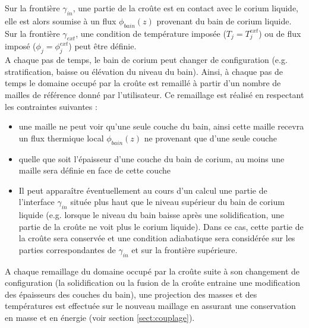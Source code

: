 Sur la frontière $\gamma_{in}$, une partie de la croûte est en contact avec le corium liquide, elle est alors soumise à un flux $\phi_{bain}(z)$ provenant du bain de corium liquide. Sur la frontière $\gamma_{ext}$, une condition de température imposée ($T_j=T_j^{ext}$) ou de flux imposé ($\phi_j=\phi_j^{ext}$) peut être définie.\\
 
A chaque pas de temps, le bain de corium peut changer de configuration (e.g. stratification, baisse ou élévation du niveau du bain). Ainsi, à chaque pas de temps le domaine occupé par la croûte est remaillé à partir d'un nombre de mailles de référence donné par l'utilisateur. Ce remaillage est réalisé en respectant les contraintes suivantes :
\begin{itemize}
    \item une maille ne peut voir qu'une seule couche du bain, ainsi cette maille recevra un flux thermique local $\phi_{bain}(z)$ ne provenant que d'une seule couche
    \item quelle que soit l'épaisseur d'une couche du bain de corium, au moins une maille sera définie en face de cette couche
    \item  Il peut apparaître éventuellement au cours d'un calcul une partie de l'interface $\gamma_{in}$ située plus haut que le niveau supérieur du bain de corium liquide (e.g. lorsque le niveau du bain baisse après une solidification, une partie de la croûte ne voit plus le corium liquide). Dans ce cas, cette partie de la croûte sera conservée et une condition adiabatique sera considérée sur les parties correspondantes de $\gamma_{in}$ et sur la frontière supérieure.\\
\end{itemize}

A chaque remaillage du domaine occupé par la croûte suite à son changement de configuration (la solidification ou la fusion de la croûte entraine une modification des épaisseurs des couches du bain), une projection des masses et des températures est effectuée sur le nouveau maillage en assurant une conservation en masse et en énergie (voir section \ref{sect:couplage}).\\

